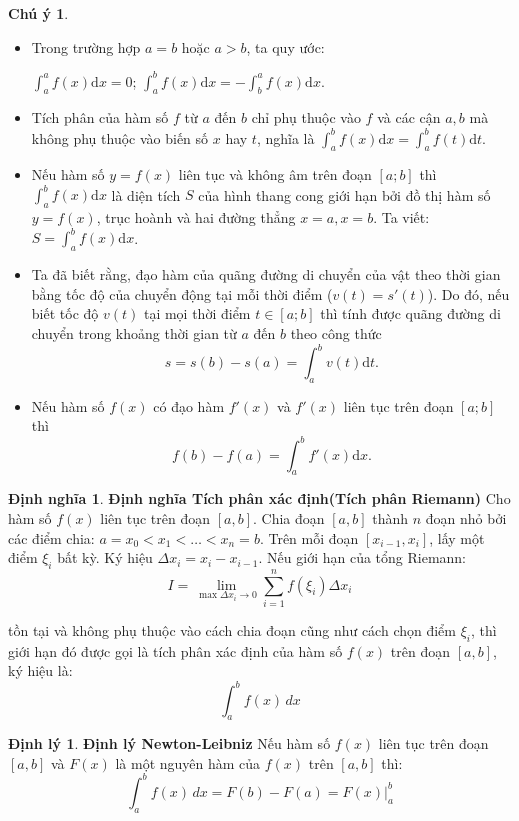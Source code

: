 \documentclass[12pt,a4paper,oneside]{book}
\theoremstyle{theorem}
\theoremstyle{definition}
\newtheorem{dn}[theorem2]{Định nghĩa}
\newtheorem{dl}[theorem2]{Định lý}
\newtheorem{cy}[theorem2]{Chú ý}
\begin{document}
\begin{cy}
\leavevmode
    \begin{itemize}
    \item Trong trường hợp $a = b$ hoặc $a > b$, ta quy ước: 
    
    $\displaystyle\int_a^a f(x) \mathrm{d}x = 0$; $\displaystyle\int_a^b f(x) \mathrm{d}x = -\int_b^a f(x) \mathrm{d}x$.

    \item Tích phân của hàm số $f$ từ $a$ đến $b$ chỉ phụ thuộc vào $f$ và các cận $a, b$ mà không phụ thuộc vào biến số $x$ hay $t$, nghĩa là $\displaystyle\int_a^b f(x) \mathrm{d}x = \int_a^b f(t) \mathrm{d}t$.

    \item Nếu hàm số $y = f(x)$ liên tục và không âm trên đoạn $[a; b]$ thì $\displaystyle\int_a^b f(x) \mathrm{d}x$ là diện tích $S$ của hình thang cong giới hạn bởi đồ thị hàm số $y = f(x)$, trục hoành và hai đường thẳng $x = a, x = b$. Ta viết: $S = \displaystyle\int_a^b f(x) \mathrm{d}x$.

    \item Ta đã biết rằng, đạo hàm của quãng đường di chuyển của vật theo thời gian bằng tốc độ của chuyển động tại mỗi thời điểm ($v(t) = s'(t)$). Do đó, nếu biết tốc độ $v(t)$ tại mọi thời điểm $t \in [a; b]$ thì tính được quãng đường di chuyển trong khoảng thời gian từ $a$ đến $b$ theo công thức 
    \[s = s(b) - s(a) = \displaystyle\int_a^b v(t) \mathrm{d}t.
\]
    \item Nếu hàm số $f(x)$ có đạo hàm $f'(x)$ và $f'(x)$ liên tục trên đoạn $[a; b]$ thì
    \[
    f(b) - f(a) = \int_a^b f'(x) \mathrm{d}x.
    \]
\end{itemize}
\end{cy}

\begin{dn}\textbf{Định nghĩa Tích phân xác định(Tích phân Riemann)}
Cho hàm số $f(x)$ liên tục trên đoạn $[a, b]$. Chia đoạn $[a, b]$ thành $n$ đoạn nhỏ bởi các điểm chia: $a = x_0 < x_1 < \dots < x_n = b$. Trên mỗi đoạn $[x_{i-1}, x_i]$, lấy một điểm $\xi_i$ bất kỳ. Ký hiệu $\Delta x_i = x_i - x_{i-1}$. 
Nếu giới hạn của tổng Riemann:
\[
I = \lim_{\max \Delta x_i \to 0} \sum_{i=1}^{n} f(\xi_i) \Delta x_i
\]
\end{dn}
tồn tại và không phụ thuộc vào cách chia đoạn cũng như cách chọn điểm $\xi_i$, thì giới hạn đó được gọi là tích phân xác định của hàm số $f(x)$ trên đoạn $[a, b]$, ký hiệu là:
\[
\int_{a}^{b} f(x) \, dx
\]
\begin{dl}
    \textbf{Định lý Newton-Leibniz}
Nếu hàm số $f(x)$ liên tục trên đoạn $[a, b]$ và $F(x)$ là một nguyên hàm của $f(x)$ trên $[a, b]$ thì:
\[
\int_{a}^{b} f(x) \, dx = F(b) - F(a) = F(x) \Big|_{a}^{b}
\]
\end{dl} 
\end{document}
